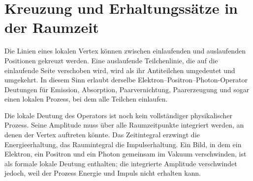 \section{Kreuzung und Erhaltungssätze in der Raumzeit}

Die Linien eines lokalen Vertex können zwischen einlaufenden und auslaufenden Positionen gekreuzt werden. Eine auslaufende Teilchenlinie, die auf die einlaufende Seite verschoben wird, wird als ihr Antiteilchen umgedeutet und umgekehrt. In diesem Sinn erlaubt derselbe Elektron--Positron--Photon-Operator Deutungen für Emission, Absorption, Paarvernichtung, Paarerzeugung und sogar einen lokalen Prozess, bei dem alle Teilchen einlaufen.

\begin{classroomqa}
\end{classroomqa}

Die lokale Deutung des Operators ist noch kein vollständiger physikalischer Prozess. Seine Amplitude muss über alle Raumzeitpunkte integriert werden, an denen der Vertex auftreten könnte. Das Zeitintegral erzwingt die Energieerhaltung, das Raumintegral die Impulserhaltung. Ein Bild, in dem ein Elektron, ein Positron und ein Photon gemeinsam im Vakuum verschwinden, ist als formale lokale Deutung enthalten; die integrierte Amplitude verschwindet jedoch, weil der Prozess Energie und Impuls nicht erhalten kann.

\begin{classroomqa}
\end{classroomqa}

\begin{classroomqa}
\end{classroomqa}

